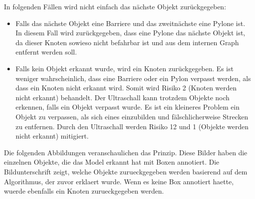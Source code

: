 In folgenden Fällen wird nicht einfach das nächste Objekt zurückgegeben:

\begin{itemize}
    \item Falls das nächste Objekt eine Barriere und das zweitnächste eine Pylone ist. In diesem Fall wird zurückgegeben, dass eine Pylone das nächste Objekt ist, da dieser Knoten sowieso nicht befahrbar ist und aus dem internen Graph entfernt werden soll.
    \item Falls kein Objekt erkannt wurde, wird ein Knoten zurückgegeben. Es ist weniger wahrscheinlich, dass eine Barriere oder ein Pylon verpasst werden, als dass ein Knoten nicht erkannt wird. Somit wird Risiko 2 (Knoten werden nicht erkannt) behandelt. Der Ultraschall kann trotzdem Objekte noch erkennen, falls ein Objekt verpasst wurde. Es ist ein kleineres Problem ein Objekt zu verpassen, als sich eines einzubilden und fälschlicherweise Strecken zu entfernen. Durch den Ultraschall werden Risiko 12 und 1 (Objekte werden nicht erkannt) mitigiert.
\end{itemize}

Die folgenden Abbildungen veranschaulichen das Prinzip. Diese Bilder haben die einzelnen Objekte, die das Model erkannt hat mit Boxen annotiert. Die Bildunterschrift zeigt, welche Objekte zurueckgegeben werden basierend auf dem Algorithmus, der zuvor erklaert wurde. Wenn es keine Box annotiert haette, wuerde ebenfalls ein Knoten zurueckgegeben werden.

